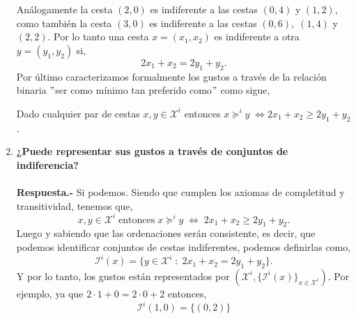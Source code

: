 \begin{enumerate}
\begin{center}
	\end{center}
	\vspace{.5cm}

	Análogamente la cesta $(2,0)$ es indiferente a las cestas $(0,4)$ y $(1,2)$, como también la cesta $(3,0)$ es indiferente a las cestas $(0,6),\; (1,4)$ y $(2,2)$. Por lo tanto una cesta $x=(x_1,x_2)$ es indiferente a otra $y=(y_1,y_2)$ si, $$2x_1 + x_2 = 2y_1 + y_2.$$
	Por último caracterizamos formalmente los gustos a través de la relación binaria $"$ser como mínimo tan preferido como$"$ como sigue,
	\begin{center}
	    Dado cualquier par de cestas $x,y \in \mathcal{X}^i$ entonces $x \succeq^i y \; \Longleftrightarrow 2x_1 + x_2 \geq 2y_1 + y_2$.
	\end{center}
	\vspace{.5cm}

    \item \textbf{¿Puede representar sus gustos a través de conjuntos de indiferencia?}\\\\
	\textbf{Respuesta.-} Si podemos. Siendo que cumplen los axiomas de completitud y transitividad, tenemos que,
	$$x,y\in \mathcal{X}^i \; \mbox{entonces} \; x\succeq^i y \; \Longleftrightarrow \; 2x_1+x_2 \geq 2y_1+y_2.$$
	Luego y sabiendo que las ordenaciones serán consistente, es decir, que podemos identificar conjuntos de cestas indiferentes, podemos definirlas como, 
	$$\mathcal{I}^i(x) = \lbrace y\in \mathcal{X}^i\; : \;  2x_1 + x_2 = 2y_1 + y_2\rbrace.$$
	Y por lo tanto, los gustos están representados por $\left(\mathcal{X}^i,\lbrace \mathcal{I}^i(x)\rbrace_{x\in \mathcal{X}^i}\right)$. Por ejemplo, ya que $2\cdot 1 + 0 = 2\cdot 0 + 2$ entonces,
	$$\mathcal{I}^i (1,0) = \lbrace (0,2) \rbrace$$
	

\end{enumerate}
